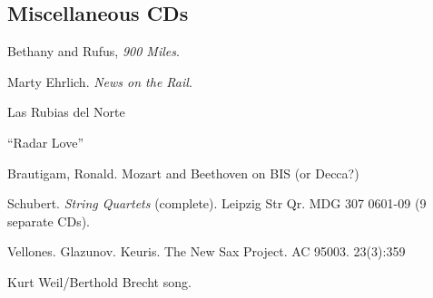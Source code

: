 \documentclass[twocolumn]{article}
\renewcommand{\a}[1]{\textsc{#1}}
\renewcommand{\t}[1]{\textsl{#1}}
\begin{document}
\bigskip

\newpage

\subsection{Miscellaneous CDs}

\leavevmode

\begingroup


\parindent-10pt

\parskip 9pt

Bethany and Rufus, \emph{900 Miles}.

Marty Ehrlich. \emph{News on the Rail}.

Las Rubias del Norte

``Radar Love''

Brautigam, Ronald.  Mozart and Beethoven on BIS (or Decca?)


Schubert. \emph{String Quartets} (complete). Leipzig Str Qr. MDG 307
0601-09 (9 separate CDs).






Vellones.  Glazunov.  Keuris.  The New Sax Project.  AC 95003.
23(3):359

Kurt Weil/Berthold Brecht song.
\end{document}
